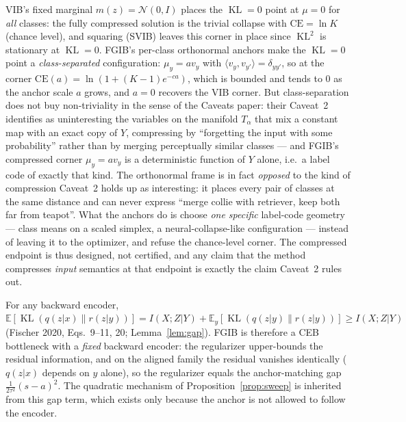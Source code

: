 \begin{remark}\label{rem:endpoint}
VIB's fixed marginal $m(z) = \mathcal{N}(0, I)$ places the $\operatorname{KL}=0$ point
at $\mu = 0$ for \emph{all} classes: the fully compressed solution is the trivial
collapse with $\mathrm{CE} = \ln K$ (chance level), and squaring (SVIB) leaves this
corner in place since $\operatorname{KL}^2$ is stationary at $\operatorname{KL}=0$.
FGIB's per-class orthonormal anchors make the $\operatorname{KL}=0$ point a
\emph{class-separated} configuration: $\mu_y = a v_y$ with
$\langle v_y, v_{y'}\rangle = \delta_{yy'}$, so at the corner
$\mathrm{CE}(a) = \ln(1 + (K-1)e^{-ca})$, which is bounded and tends to $0$ as the
anchor scale $a$ grows, and $a = 0$ recovers the VIB corner. But class-separation does
not buy non-triviality in the sense of the Caveats paper: their Caveat~2 identifies as
uninteresting the variables on the manifold $T_\alpha$ that mix a constant map with an
exact copy of $Y$, compressing by ``forgetting the input with some probability'' rather
than by merging perceptually similar classes --- and FGIB's compressed corner
$\mu_y = a v_y$ is a deterministic function of $Y$ alone, i.e.\ a label code of exactly
that kind. The orthonormal frame is in fact \emph{opposed} to the kind of compression
Caveat~2 holds up as interesting: it places every pair of classes at the same distance
and can never express ``merge collie with retriever, keep both far from teapot''. What
the anchors do is choose \emph{one specific} label-code geometry --- class means on a
scaled simplex, a neural-collapse-like configuration --- instead of leaving it to the
optimizer, and refuse the chance-level corner. The compressed endpoint is thus designed,
not certified, and any claim that the method compresses \emph{input} semantics at that
endpoint is exactly the claim Caveat~2 rules out.
\end{remark}

\begin{remark}\label{rem:residual}
For any backward encoder, $\mathbb{E}[\operatorname{KL}(q(z|x)\|r(z|y))]
= I(X;Z|Y) + \mathbb{E}_y[\operatorname{KL}(q(z|y)\|r(z|y))]
\ge I(X;Z|Y)$ (Fischer 2020, Eqs.~9--11, 20; Lemma~\ref{lem:gap}). FGIB is therefore a
CEB bottleneck with a \emph{fixed} backward encoder: the regularizer upper-bounds the
residual information, and on the aligned family the residual vanishes identically
($q(z|x)$ depends on $y$ alone), so the regularizer equals the anchor-matching gap
$\tfrac{1}{2\tau^2}(s-a)^2$. The quadratic mechanism of Proposition~\ref{prop:sweep} is
inherited from this gap term, which exists only because the anchor is not allowed to
follow the encoder.
\end{remark}

